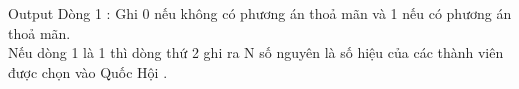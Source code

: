 Output
Dòng 1 : Ghi 0 nếu không có phương án thoả mãn và 1 nếu có phương án thoả mãn.   
\\   Nếu dòng 1 là 1 thì dòng thứ 2 ghi ra N số nguyên là số hiệu của các thành viên được chọn vào Quốc Hội .